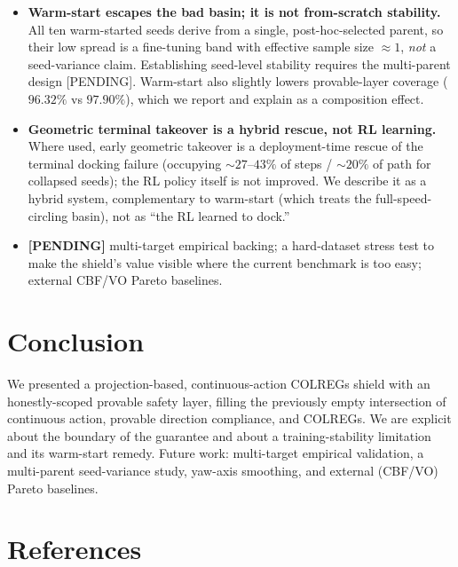 \documentclass[12pt,letterpaper]{article}
\theoremstyle{remark}\newtheorem*{scope}{Scope and honest limits}
\begin{document}
\begin{itemize}
  \item \textbf{Warm-start escapes the bad basin; it is not from-scratch
  stability.} All ten warm-started seeds derive from a single, post-hoc-selected
  parent, so their low spread is a fine-tuning band with effective sample size
  $\approx 1$, \emph{not} a seed-variance claim. Establishing seed-level stability
  requires the multi-parent design [PENDING]. Warm-start also slightly lowers
  provable-layer coverage ($96.32\%$ vs $97.90\%$), which we report and explain as
  a composition effect.

  \item \textbf{Geometric terminal takeover is a hybrid rescue, not RL learning.}
  Where used, early geometric takeover is a deployment-time rescue of the terminal
  docking failure (occupying $\sim\!27$--$43\%$ of steps / $\sim\!20\%$ of path for
  collapsed seeds); the RL policy itself is not improved. We describe it as a hybrid
  system, complementary to warm-start (which treats the full-speed-circling basin),
  not as ``the RL learned to dock.''

  \item \textbf{[PENDING]} multi-target empirical backing; a hard-dataset stress
  test to make the shield's value visible where the current benchmark is too easy;
  external CBF/VO Pareto baselines.
\end{itemize}

\section{Conclusion}
We presented a projection-based, continuous-action COLREGs shield with an
honestly-scoped provable safety layer, filling the previously empty intersection of
continuous action, provable direction compliance, and COLREGs. We are explicit
about the boundary of the guarantee and about a training-stability limitation and
its warm-start remedy. Future work: multi-target empirical validation, a
multi-parent seed-variance study, yaw-axis smoothing, and external
(CBF/VO) Pareto baselines.

\section*{References}
\end{document}
